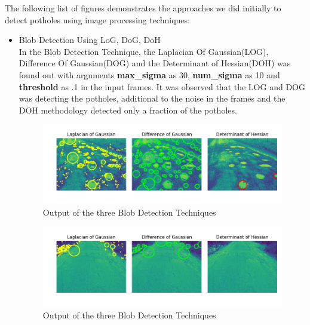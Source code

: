 \documentclass[12pt,a4paper]{article}
\begin{document}
The following list of figures demonstrates the approaches we did initially to detect potholes using image processing techniques:

\begin{itemize}
\item Blob Detection Using LoG, DoG, DoH \\

In the Blob Detection Technique, the Laplacian Of Gaussian(LOG), Difference Of Gaussian(DOG) and the Determinant of Hessian(DOH) was found out with arguments \textbf{max\_sigma} as 30, \textbf{num\_sigma} as 10 and \textbf{threshold} as .1 in the input frames. It was observed that the LOG and DOG was detecting the potholes, additional to the noise in the frames and the DOH methodology detected only a fraction of the potholes.

    

    \begin{figure}[ht!]
        \centering
        \includegraphics[width = 6in]{images/blob_3.png}
        \caption{Output of the three Blob Detection Techniques}
    \end{figure}
    
    
    
    \begin{figure}[ht!]
        \centering
        \includegraphics[width = 6in]{images/blob_1.png}
        \caption{Output of the three Blob Detection Techniques}
    \end{figure}
    

\end{itemize}
\end{document}
